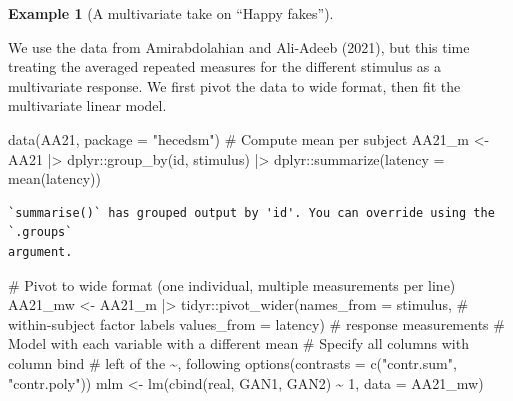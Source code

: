 \documentclass[
  11pt,
  letterpaper,
]{scrbook}
\newenvironment{Shaded}{\begin{snugshade}}{\end{snugshade}}
\newcommand{\AttributeTok}[1]{\textcolor[rgb]{0.40,0.45,0.13}{#1}}
\newcommand{\CommentTok}[1]{\textcolor[rgb]{0.37,0.37,0.37}{#1}}
\newcommand{\DecValTok}[1]{\textcolor[rgb]{0.68,0.00,0.00}{#1}}
\newcommand{\FunctionTok}[1]{\textcolor[rgb]{0.28,0.35,0.67}{#1}}
\newcommand{\NormalTok}[1]{\textcolor[rgb]{0.00,0.23,0.31}{#1}}
\newcommand{\OtherTok}[1]{\textcolor[rgb]{0.00,0.23,0.31}{#1}}
\newcommand{\SpecialCharTok}[1]{\textcolor[rgb]{0.37,0.37,0.37}{#1}}
\newcommand{\StringTok}[1]{\textcolor[rgb]{0.13,0.47,0.30}{#1}}
\theoremstyle{definition}
\newtheorem{example}{Example}[chapter]
\theoremstyle{definition}
\theoremstyle{remark}
\begin{document}
\begin{example}[A multivariate take on ``Happy
fakes'']\protect\hypertarget{exm-happyfakemulti}{}\label{exm-happyfakemulti}

We use the data from Amirabdolahian and Ali-Adeeb (2021), but this time
treating the averaged repeated measures for the different stimulus as a
multivariate response. We first pivot the data to wide format, then fit
the multivariate linear model.

\begin{Shaded}
\begin{Highlighting}[]
\FunctionTok{data}\NormalTok{(AA21, }\AttributeTok{package =} \StringTok{"hecedsm"}\NormalTok{)}
\CommentTok{\# Compute mean per subject}
\NormalTok{AA21\_m }\OtherTok{\textless{}{-}}\NormalTok{ AA21 }\SpecialCharTok{|\textgreater{}}
\NormalTok{  dplyr}\SpecialCharTok{::}\FunctionTok{group\_by}\NormalTok{(id, stimulus) }\SpecialCharTok{|\textgreater{}}
\NormalTok{  dplyr}\SpecialCharTok{::}\FunctionTok{summarize}\NormalTok{(}\AttributeTok{latency =} \FunctionTok{mean}\NormalTok{(latency))}
\end{Highlighting}
\end{Shaded}

\begin{verbatim}
`summarise()` has grouped output by 'id'. You can override using the `.groups`
argument.
\end{verbatim}

\begin{Shaded}
\begin{Highlighting}[]
\CommentTok{\# Pivot to wide format (one individual, multiple measurements per line)}
\NormalTok{AA21\_mw }\OtherTok{\textless{}{-}}\NormalTok{ AA21\_m }\SpecialCharTok{|\textgreater{}}
\NormalTok{  tidyr}\SpecialCharTok{::}\FunctionTok{pivot\_wider}\NormalTok{(}\AttributeTok{names\_from =}\NormalTok{ stimulus, }\CommentTok{\# within{-}subject factor labels}
                     \AttributeTok{values\_from =}\NormalTok{ latency) }\CommentTok{\# response measurements }
\CommentTok{\# Model with each variable with a different mean}
\CommentTok{\# Specify all columns with column bind }
\CommentTok{\# left of the \textasciitilde{}, following }
\FunctionTok{options}\NormalTok{(}\AttributeTok{contrasts =} \FunctionTok{c}\NormalTok{(}\StringTok{"contr.sum"}\NormalTok{, }\StringTok{"contr.poly"}\NormalTok{))}
\NormalTok{mlm }\OtherTok{\textless{}{-}} \FunctionTok{lm}\NormalTok{(}\FunctionTok{cbind}\NormalTok{(real, GAN1, GAN2) }\SpecialCharTok{\textasciitilde{}} \DecValTok{1}\NormalTok{,}
          \AttributeTok{data =}\NormalTok{ AA21\_mw)}
\end{Highlighting}
\end{Shaded}


\end{example}
\end{document}
